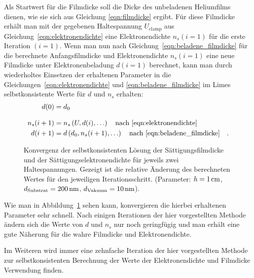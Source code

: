 Als Startwert für die Filmdicke soll die Dicke des unbeladenen Heliumfilms dienen, wie sie sich aus Gleichung \eqref{eqn:filmdicke} ergibt. Für diese Filmdicke erhält man mit der gegebenen Haltespannung $U_\text{clamp}$ aus Gleichung~\eqref{eqn:elektronendichte} eine Elektronendichte $n_s(i=1)$ für die erste Iteration $(i=1)$. Wenn man nun nach Gleichung~\eqref{eqn:beladene_filmdicke} für die berechnete Anfangsfilmdicke und Elektronendichte $n_s(i=1)$ eine neue Filmdicke unter Elektronenbeladung $d(i=1)$ berechnet, kann man durch wiederholtes Einsetzen der erhaltenen Parameter in die Gleichungen~\eqref{eqn:elektronendichte} und \eqref{eqn:beladene_filmdicke} im Limes selbstkonsistente Werte für $d$ und $n_s$ erhalten:
\begin{equation}
    \begin{aligned}
        d(0) &= d_0\\[2ex]
        n_s(i+1) &= n_s\left(U,d(i), \ldots\right)\quad\text{nach \eqref{eqn:elektronendichte}}\\
        d(i+1) &= d\left(d_0,n_s(i+1), \ldots\right)\quad\text{nach \eqref{eqn:beladene_filmdicke}} \quad.
    \end{aligned}
\end{equation}
\begin{figure}[h!tbp]
    \centerline{\hfill%
        \hfill%
        \hfill%
    }
    \caption[Konvergenz der selbstkonsistenten Lösung]{Konvergenz der selbstkonsistenten Lösung der Sättigungsfilmdicke und der Sättigungselektronendichte für jeweils zwei Haltespannungen. Gezeigt ist die relative Änderung des berechneten Wertes für den jeweiligen Iterationsschritt.
(Parameter: $h=\unit[1]{cm}$, $d_\text{Substrat}=\unit[200]{nm}$, $d_\text{Vakuum}=\unit[10]{nm}$).}\label{fig:film_rekursion}
\end{figure}
Wie man in Abbildung~\ref{fig:film_rekursion} sehen kann, konvergieren die hierbei erhaltenen Parameter sehr schnell. Nach einigen Iterationen der hier vorgestellten Methode ändern sich die Werte von $d$ und $n_s$ nur noch geringfügig und man erhält eine gute Näherung für die wahre Filmdicke und Elektronendichte.

Im Weiteren wird immer eine zehnfache Iteration der hier vorgestellten Methode zur selbstkonsistenten Berechnung der Werte der Elektronendichte und Filmdicke Verwendung finden.

